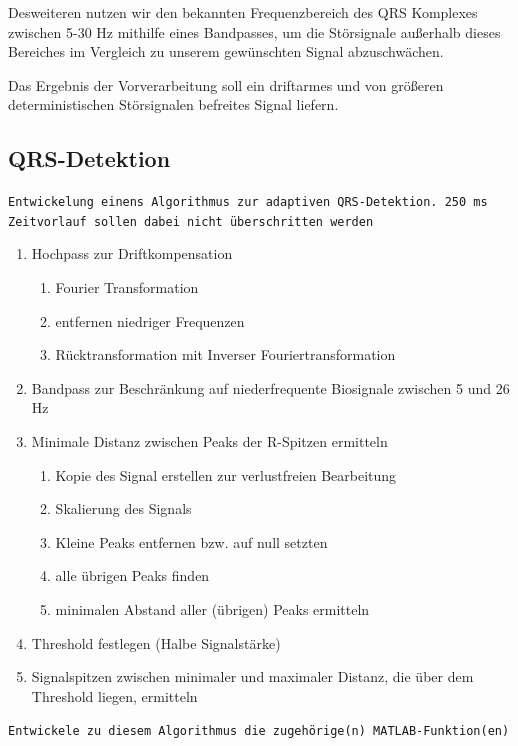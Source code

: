 \documentclass[a4paper,12pt,titlepage]{scrartcl}
\begin{document}
Desweiteren nutzen wir den bekannten Frequenzbereich des QRS Komplexes zwischen 5-30 Hz mithilfe eines Bandpasses, um die Störsignale außerhalb dieses Bereiches im Vergleich zu unserem gewünschten Signal abzuschwächen.

Das Ergebnis der Vorverarbeitung soll ein driftarmes und von größeren deterministischen Störsignalen befreites Signal liefern.

\subsection{QRS-Detektion}
\texttt{Entwickelung einens Algorithmus zur adaptiven QRS-Detektion. 250 ms Zeitvorlauf sollen dabei nicht überschritten werden}

\begin{enumerate}
    \item Hochpass zur Driftkompensation
          \begin{enumerate}
              \item Fourier Transformation
              \item entfernen niedriger Frequenzen
              \item Rücktransformation mit Inverser Fouriertransformation
          \end{enumerate}
    \item Bandpass zur Beschränkung auf niederfrequente Biosignale zwischen 5 und 26 Hz
    \item Minimale Distanz zwischen Peaks der R-Spitzen ermitteln
          \begin{enumerate}
              \item Kopie des Signal erstellen zur verlustfreien Bearbeitung
              \item Skalierung des Signals
              \item Kleine Peaks entfernen bzw. auf null setzten
              \item alle übrigen Peaks finden
              \item minimalen Abstand aller (übrigen) Peaks ermitteln
          \end{enumerate}
    \item Threshold festlegen (Halbe Signalstärke)
    \item Signalspitzen zwischen minimaler und maximaler Distanz, die über dem Threshold liegen, ermitteln
\end{enumerate}

\texttt{Entwickele zu diesem Algorithmus die zugehörige(n) MATLAB-Funktion(en)}
\end{document}
